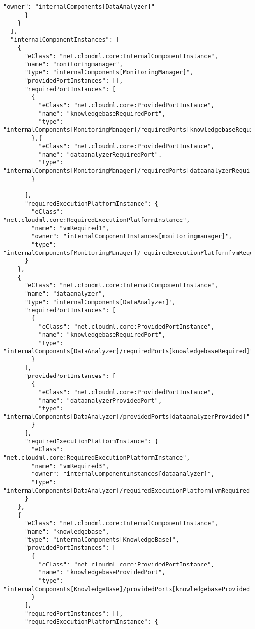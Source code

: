 \begin{lstlisting}[mathescape,caption={The .json to deplot the \mm on Flexiant},label={lst:mpflexi}]
        "owner": "internalComponents[DataAnalyzer]"
      }
    }
  ],
  "internalComponentInstances": [
    {
      "eClass": "net.cloudml.core:InternalComponentInstance",
      "name": "monitoringmanager",
      "type": "internalComponents[MonitoringManager]",
      "providedPortInstances": [],
      "requiredPortInstances": [
        {
          "eClass": "net.cloudml.core:ProvidedPortInstance",
          "name": "knowledgebaseRequiredPort",
          "type": "internalComponents[MonitoringManager]/requiredPorts[knowledgebaseRequired]"
        },{
          "eClass": "net.cloudml.core:ProvidedPortInstance",
          "name": "dataanalyzerRequiredPort",
          "type": "internalComponents[MonitoringManager]/requiredPorts[dataanalyzerRequired]"
        }
	
      ],
      "requiredExecutionPlatformInstance": {
        "eClass": "net.cloudml.core:RequiredExecutionPlatformInstance",
        "name": "vmRequired1",
        "owner": "internalComponentInstances[monitoringmanager]",
        "type": "internalComponents[MonitoringManager]/requiredExecutionPlatform[vmRequired]"
      }
    },
    {
      "eClass": "net.cloudml.core:InternalComponentInstance",
      "name": "dataanalyzer",
      "type": "internalComponents[DataAnalyzer]",
      "requiredPortInstances": [
        {
          "eClass": "net.cloudml.core:ProvidedPortInstance",
          "name": "knowledgebaseRequiredPort",
          "type": "internalComponents[DataAnalyzer]/requiredPorts[knowledgebaseRequired]"
        }
      ],
      "providedPortInstances": [
        {
          "eClass": "net.cloudml.core:ProvidedPortInstance",
          "name": "dataanalyzerProvidedPort",
          "type": "internalComponents[DataAnalyzer]/providedPorts[dataanalyzerProvided]"
        }
      ],
      "requiredExecutionPlatformInstance": {
        "eClass": "net.cloudml.core:RequiredExecutionPlatformInstance",
        "name": "vmRequired3",
        "owner": "internalComponentInstances[dataanalyzer]",
        "type": "internalComponents[DataAnalyzer]/requiredExecutionPlatform[vmRequired]"
      }
    },
    {
      "eClass": "net.cloudml.core:InternalComponentInstance",
      "name": "knowledgebase",
      "type": "internalComponents[KnowledgeBase]",
      "providedPortInstances": [
        {
          "eClass": "net.cloudml.core:ProvidedPortInstance",
          "name": "knowledgebaseProvidedPort",
          "type": "internalComponents[KnowledgeBase]/providedPorts[knowledgebaseProvided]"
        }
      ],
      "requiredPortInstances": [],
      "requiredExecutionPlatformInstance": {

\end{lstlisting}
